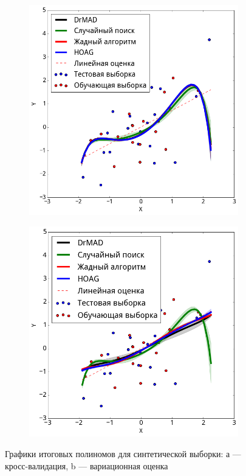     \begin{figure}

    \begin{subfigure}[b]{0.5\textwidth}
    \includegraphics[width=0.8\linewidth]{plots/hyperparams/poly_cv.png}

    \end{subfigure}
    \begin{subfigure}[b]{0.5\textwidth}
    \includegraphics[width=0.8\linewidth]{plots/hyperparams/poly_var.png}

    \end{subfigure}

  \label{fig:poly}
    \caption{Графики итоговых полиномов для синтетической выборки: а --- кросс-валидация, b --- вариационная оценка}
    \end{figure}




